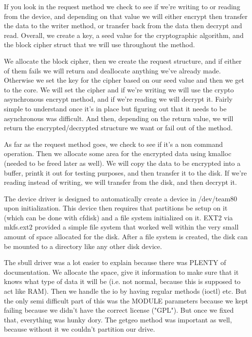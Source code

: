 \documentclass[letterpaper,10pt]{article}
\begin{document}
If you look in the request method we check to see if we’re writing to or reading from the device, and depending on that value we will either encrypt then transfer the data to the writer method, or transfer back from the data then decrypt and read. Overall, we create a key, a seed value for the cryptographic algorithm, and the block cipher struct that we will use throughout the method. 

We allocate the block cipher, then we create the request structure, and if either of them fails we will return and deallocate anything we’ve already made. Otherwise we set the key for the cipher based on our seed value and then we get to the core. We will set the cipher and if we’re writing we will use the crypto asynchronous encrypt method, and if we’re reading we will decrypt it. Fairly simple to understand once it’s in place but figuring out that it needs to be asynchronous was difficult. And then, depending on the return value, we will return the encrypted/decrypted structure we want or fail out of the method. 

As far as the request method goes, we check to see if it's a non command operation. Then we allocate some area for the encrypted data using kmalloc (needed to be freed later as well). We will copy the data to be encrypted into a buffer, printk it out for testing purposes, and then transfer it to the disk. If we're reading instead of writing, we will transfer from the disk, and then decrypt it. 


The device driver is designed to automatically create a device in /dev/team80 upon initialization.  This device then requires that partitions be setup on it (which can be done with cfdisk) and a ﬁle system initialized on it. EXT2 via mkfs.ext2 provided a simple ﬁle system that worked well within the very small amount of space allocated for the disk. After a ﬁle system is created, the disk can be mounted to a directory like any other disk device.

The sbull driver was a lot easier to explain because there was PLENTY of documentation. We allocate the space, give it information to make sure that it knows what type of data it will be (i.e. not normal, because this is supposed to act like RAM). Then we handle the io by having regular methods (ioctl) etc. But the only semi difficult part of this was the MODULE parameters because we kept failing because we didn't have the correct license ("GPL"). But once we fixed that, everything was hunky dory. The getgeo method was important as well, because without it we couldn't partition our drive. 
\end{document}
